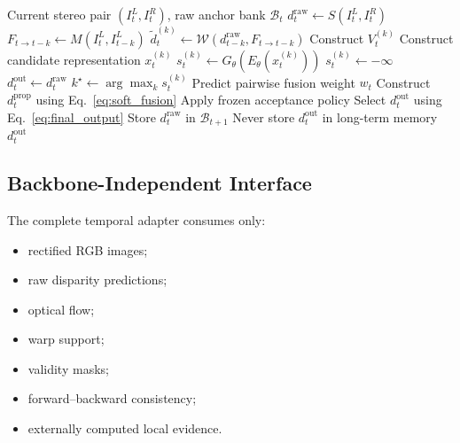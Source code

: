 \documentclass[11pt,a4paper]{article}
\begin{document}
\begin{algorithm}[t]
\caption{Immutable raw multi-anchor temporal refinement}
\label{alg:multi_anchor}
\begin{algorithmic}[1]
\Require Current stereo pair
\((I_t^L,I_t^R)\), raw anchor bank \(\mathcal{B}_t\)
\State \(d_t^{\mathrm{raw}}
       \gets S(I_t^L,I_t^R)\)
        \State
        \(F_{t\rightarrow t-k}
        \gets M(I_t^L,I_{t-k}^L)\)
        \State
        \(\widetilde d_t^{(k)}
        \gets
        \mathcal{W}
        (d_{t-k}^{\mathrm{raw}},
        F_{t\rightarrow t-k})\)
        \State Construct \(V_t^{(k)}\)
        \State Construct candidate representation \(x_t^{(k)}\)
        \State
        \(s_t^{(k)}
        \gets
        G_\theta(E_\theta(x_t^{(k)}))\)
    \Else
        \State \(s_t^{(k)}\gets-\infty\)
    \EndIf
\EndFor
{}
    \State \(d_t^{\mathrm{out}}\gets d_t^{\mathrm{raw}}\)
\Else
    \State
    \(k^\star\gets\arg\max_k s_t^{(k)}\)
    \State Predict pairwise fusion weight \(w_t\)
    \State Construct \(d_t^{\mathrm{prop}}\) using
    Eq.~\eqref{eq:soft_fusion}
    \State Apply frozen acceptance policy
    \State Select \(d_t^{\mathrm{out}}\) using
    Eq.~\eqref{eq:final_output}
\EndIf
\State Store \(d_t^{\mathrm{raw}}\) in \(\mathcal{B}_{t+1}\)
\State Never store \(d_t^{\mathrm{out}}\) in long-term memory
\State \Return \(d_t^{\mathrm{out}}\)
\end{algorithmic}
\end{algorithm}

\subsection{Backbone-Independent Interface}
\label{sec:backbone_independent}

The complete temporal adapter consumes only:

\begin{itemize}
    \item rectified RGB images;
    \item raw disparity predictions;
    \item optical flow;
    \item warp support;
    \item validity masks;
    \item forward--backward consistency;
    \item externally computed local evidence.
\end{itemize}
\end{document}

